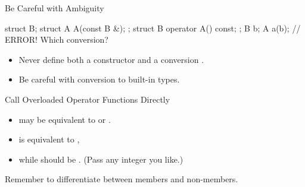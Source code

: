 \begin{frame}[fragile]{Be Careful with Ambiguity}
    \begin{cpp}
struct B;
struct A {
  A(const B &);
};
struct B {
  operator A() const;
};
B b;
A a(b); // ERROR! Which conversion?
    \end{cpp}
    \begin{itemize}
        \item Never define both a constructor  and a conversion .
        \item Be careful with conversion to built-in types.
    \end{itemize}
\end{frame}

\begin{frame}[fragile]{Call Overloaded Operator Functions Directly}
    \begin{itemize}
        \item {} may be equivalent to  or .
        \item {} is equivalent to ,
        \item while  should be . (Pass any integer you like.)
    \end{itemize}
    Remember to differentiate between members and non-members.
\end{frame}